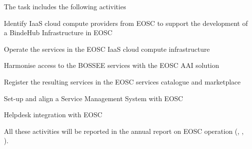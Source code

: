 \begin{task}[
  title=Collaboration with EOSC,
  id=eosc,
  lead=EGI,
  PM=24,
  wphases={12-48},
  partners={SRL,WTT,XFEL}
]
  The task includes the following activities

  \begin{compactitem}
  \item Identify IaaS cloud compute providers from EOSC to support the development of a BindeHub Infrastructure in EOSC
  \item Operate the services in the EOSC IaaS cloud compute infrastructure
  \item Harmonise access to the BOSSEE services with the EOSC AAI solution
  \item Register the resulting services in the EOSC services catalogue and marketplace
  \item Set-up and align a Service Management System with EOSC
  \item Helpdesk integration with EOSC
  \end{compactitem}

   All these activities will be reported in the annual report on EOSC operation (, , ).
\end{task}
